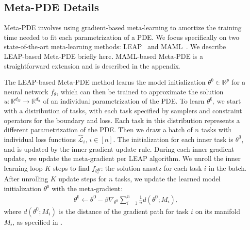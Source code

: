 \subsection{Meta-PDE Details}


Meta-PDE involves using gradient-based meta-learning to amortize the training time needed to fit each parametrization of a PDE. We focus specifically on two state-of-the-art meta-learning methods: LEAP~\citep{flennerhag2018transferring} and MAML~\citep{finn2017model}. We describe LEAP-based Meta-PDE briefly here. MAML-based Meta-PDE is a straightforward extension and is described in the appendix.

The LEAP-based Meta-PDE method learns the model initialization $\theta^0 \in \mathbb{R}^p$ for a neural network $f_\theta$, which can then be trained to approximate the solution $u: \mathbb{R}^{d_\Omega} \to \mathbb{R}^{d_u}$ of an individual parametrization of the PDE. To learn $\theta^0$, we start with a distribution of tasks, with each task specified by samplers and constraint operators for the boundary and loss. Each task in this distribution represents a different parametrization of the PDE. Then we draw a batch of $n$ tasks with individual loss functions $\hat{\mathcal{L}}_i$, $i \in [n]$. The initialization for each inner task is $\theta^0$, and is updated by the inner gradient update rule. During each inner gradient update, we update the meta-gradient per LEAP algorithm. We unroll the inner learning loop $K$ steps to find $f_{\theta_i^K}$: the solution ansatz for each task $i$ in the batch. After unrolling $K$ update steps for $n$ tasks, we update the learned model initialization $\theta^0$ with the meta-gradient:
\begin{align}
    \theta^0 \leftarrow \theta^0 - \beta \nabla_{\theta^0}\sum_{i=1}^n \frac{1}{n} d(\theta^0; M_i),
\end{align}
where $d(\theta^0; M_i)$ is the distance of the gradient path for task $i$ on its manifold $M_i$, as specified in \citep{flennerhag2018transferring}.


